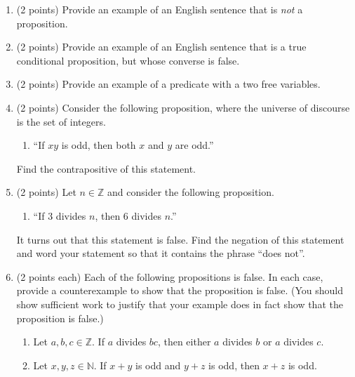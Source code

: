 \documentclass[11pt]{article}
\theoremstyle{definition}
\begin{document}
\begin{enumerate}

\item (2 points) Provide an example of an English sentence that is \emph{not} a proposition.

\item (2 points) Provide an example of an English sentence that is a true conditional proposition, but whose converse is false.

\item (2 points) Provide an example of a predicate with a two free variables.

\item (2 points) Consider the following proposition, where the universe of discourse is the set of integers.

\begin{enumerate}
\item[] ``If $xy$ is odd, then both $x$ and $y$ are odd.''
\end{enumerate}

Find the contrapositive of this statement.

\item (2 points) Let $n\in\mathbb{Z}$ and consider the following proposition.

\begin{enumerate}
\item[] ``If 3 divides $n$, then 6 divides $n$.''
\end{enumerate}

It turns out that this statement is false.  Find the negation of this statement and word your statement so that it contains the phrase ``does not''.

\item (2 points each)  Each of the following propositions is false.  In each case, provide a counterexample to show that the proposition is false.  (You should show sufficient work to justify that your example does in fact show that the proposition is false.)

\begin{enumerate}

\item Let $a, b, c \in \mathbb{Z}$. If $a$ divides $bc$, then either $a$ divides $b$ or $a$ divides $c$.

\item Let $x,y,z \in \mathbb{N}$. If $x+y$ is odd and $y+z$ is odd, then $x+z$ is odd.

\end{enumerate}


\end{enumerate}
\end{document}
